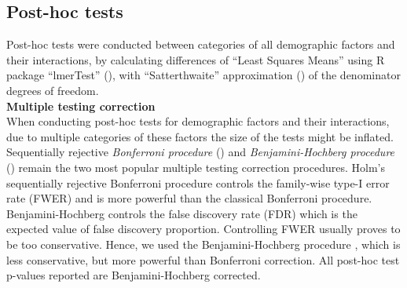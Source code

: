 \documentclass[11pt]{extarticle} %
\begin{document}
\subsection{Post-hoc tests}
Post-hoc tests were conducted between categories of all demographic factors and their interactions, by calculating differences of ``Least Squares Means'' using R package ``lmerTest'' (\cite{Kuznetsova_etal_2015_R-lmerTest}), with ``Satterthwaite'' approximation (\cite{Satterthwaite_1946_Biometrics}) of the denominator degrees of freedom. \\
\noindent
{\bf{Multiple testing correction}}\\
When conducting post-hoc tests for demographic factors and their interactions, due to multiple categories of these factors the size of the tests might be inflated. Sequentially rejective {\emph{Bonferroni procedure}} (\cite{Holm_1979_SJS}) and {\emph{Benjamini-Hochberg procedure}} (\cite{Benjamini_Hochberg_1995_JRSSB}) remain the two most popular multiple testing correction procedures. Holm's sequentially rejective Bonferroni procedure controls the family-wise type-I error rate (FWER) and is more powerful than the classical Bonferroni procedure. Benjamini-Hochberg controls the false discovery rate (FDR) which is the expected value of false discovery proportion. Controlling FWER usually proves to be too conservative. Hence, we used the Benjamini-Hochberg procedure , which is less conservative, but more powerful than Bonferroni correction. All post-hoc test p-values reported are Benjamini-Hochberg corrected.
\end{document}
